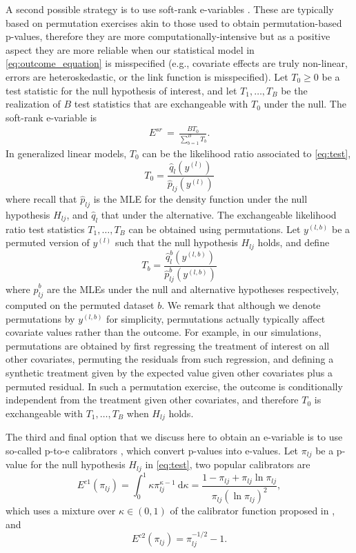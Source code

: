 \documentclass[pdflatex,sn-mathphys-num]{sn-jnl}%
\theoremstyle{thmstyleone}%
\theoremstyle{thmstyletwo}%
\theoremstyle{thmstylethree}%
\begin{document}
A second possible strategy is to use soft-rank e-variables \citep{koning:2023}. 
These are typically based on permutation exercises akin to those used to obtain permutation-based p-values, therefore they are more computationally-intensive but as a positive aspect they are more reliable when our statistical model in \eqref{eq:outcome_equation} is misspecified (e.g., covariate effects are truly non-linear, errors are heteroskedastic, \color{blue} or the link function is misspecified\color{black}).
Let $T_0 \geq 0$ be a test statistic for the null hypothesis of interest, and let $T_1,\ldots,T_B$ be the realization of $B$ test statistics that are exchangeable with $T_0$ under the null. The soft-rank e-variable is 
\begin{align}
  E^{sr} \,=\,\frac{B T_0}{\sum_{b=1}^{B}T_b}.
\end{align}
In generalized linear models, %
$T_0$ can be the likelihood ratio associated to \eqref{eq:test},
\begin{equation}\label{eq:lrt}
  T_0=\frac{\hat{q}_l(y^{(l)})}{ \hat{p}_{lj}(y^{(l)})}
\end{equation}
where recall that $\hat{p}_{lj}$ is the MLE for the density function under the null hypothesis $H_{lj}$, and $\hat{q}_l$ that under the alternative. 
The exchangeable likelihood ratio test statistics $T_1,\ldots,T_B$ can be obtained using permutations. 
Let $y^{(l,b)}$ be a permuted version of $y^{(l)}$ such that the null hypothesis $H_{lj}$ holds, and define
\[T_b=\frac{\hat{q}^{b}_l(y^{(l,b)})}{ \hat{p}^b_{lj}(y^{(l,b)})}\] 
where $\hat{p}^b_{lj}$ are the MLEs under the null and alternative hypotheses respectively, computed on the permuted dataset $b$. We remark that although we denote permutations by $y^{(l,b)}$ for simplicity, permutations actually typically affect covariate values rather than the outcome. For example, in our simulations, permutations are obtained by first regressing the treatment of interest on all other covariates, permuting the residuals from such regression, and defining a synthetic treatment given by the expected value given other covariates plus a permuted residual. In such a permutation exercise, the outcome is conditionally independent from the treatment given other covariates, and therefore $T_0$ is exchangeable with $T_1,\ldots,T_B$ when $H_{lj}$ holds.

The third and final option that we discuss here to obtain an e-variable is to use so-called p-to-e calibrators \cite{ramdas:2025}, which convert p-values into e-values. Let $\pi_{lj}$ be a p-value for the null hypothesis $H_{lj}$ in \eqref{eq:test}, two popular calibrators are
\begin{equation}
  E^{c1}(\pi_{lj})=\int_0^1 \kappa \pi_{lj}^{\kappa-1} \mathrm{~d} \kappa=\frac{1-\pi_{lj}+\pi_{lj} \ln \pi_{lj}}{\pi_{lj}(\ln \pi_{lj})^2},
\label{eq:calibrator1}
\end{equation}
which uses a mixture over $\kappa\in(0,1)$ of the calibrator function proposed in \cite{shafer:2011}, and
\begin{equation}
  E^{c2}(\pi_{lj})=\pi_{lj}^{-1/2} -1.
\label{eq:calibrator2}
\end{equation}
\end{document}
